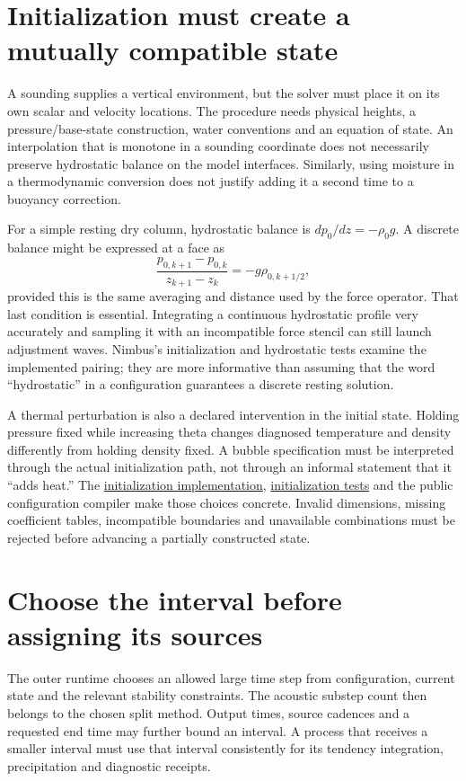 \section{Initialization must create a mutually compatible state}

A sounding supplies a vertical environment, but the solver must place it on
its own scalar and velocity locations. The procedure needs physical heights,
a pressure/base-state construction, water conventions and an equation of state.
An interpolation that is monotone in a sounding coordinate does not
necessarily preserve hydrostatic balance on the model interfaces. Similarly,
using moisture in a thermodynamic conversion does not justify adding it a
second time to a buoyancy correction.

For a simple resting dry column, hydrostatic balance is
$dp_0/dz=-\rho_0g$. A discrete balance might be expressed at a face as
\[
 \frac{p_{0,k+1}-p_{0,k}}{z_{k+1}-z_k}
 =-g\rho_{0,k+1/2},
\]
provided this is the same averaging and distance used by the force operator.
That last condition is essential. Integrating a continuous hydrostatic profile
very accurately and sampling it with an incompatible force stencil can still
launch adjustment waves. Nimbus's initialization and hydrostatic tests examine
the implemented pairing; they are more informative than assuming that the word
``hydrostatic'' in a configuration guarantees a discrete resting solution.

A thermal perturbation is also a declared intervention in the initial state.
Holding pressure fixed while increasing theta changes diagnosed temperature
and density differently from holding density fixed. A bubble specification
must be interpreted through the actual initialization path, not through an
informal statement that it ``adds heat.'' The
\href{../src/init}{initialization implementation},
\href{../tests/init}{initialization tests} and the public configuration compiler
make those choices concrete. Invalid dimensions, missing coefficient tables,
incompatible boundaries and unavailable combinations must be rejected before
advancing a partially constructed state.

\section{Choose the interval before assigning its sources}

The outer runtime chooses an allowed large time step from configuration, current
state and the relevant stability constraints. The acoustic substep count then
belongs to the chosen split method. Output times, source cadences and a requested
end time may further bound an interval. A process that receives a smaller
interval must use that interval consistently for its tendency integration,
precipitation and diagnostic receipts.

